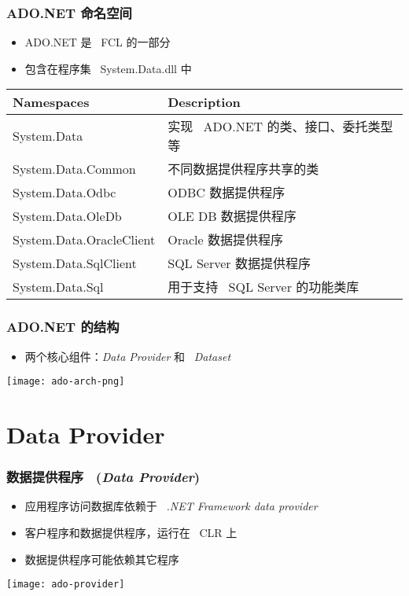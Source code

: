 \begin{frame}
\frametitle{ADO.NET 命名空间}

\begin{itemize}
\item ADO.NET 是 ~FCL 的一部分
\item 包含在程序集 ~System.Data.dll 中
\end{itemize}

\begin{tabular}{l|l}
\hline
\textbf{Namespaces} & \textbf{Description} \\
\hline
\small System.Data & 实现 ~ADO.NET 的类、接口、委托类型等 \\
\small System.Data.Common & 不同数据提供程序共享的类 \\
\small System.Data.Odbc & ODBC 数据提供程序 \\
\small System.Data.OleDb & OLE DB 数据提供程序 \\
\small System.Data.OracleClient & Oracle 数据提供程序 \\
\small System.Data.SqlClient & SQL Server 数据提供程序 \\
\small System.Data.Sql & 用于支持 ~SQL Server 的功能类库 \\
\hline
\end{tabular}
\end{frame}

\begin{frame}
\frametitle{ADO.NET 的结构}

\begin{itemize}
\item 两个核心组件：\textit{Data Provider} 和 ~\textit{Dataset}
\end{itemize}

\begin{center}
  \texttt{[image: ado-arch-png]}
\end{center}

\end{frame}

\section{Data Provider}

\begin{frame}
\frametitle{数据提供程序 ~(\textit{Data Provider})}
\begin{itemize}
\item 应用程序访问数据库依赖于 ~\textit{.NET Framework data provider}
\item 客户程序和数据提供程序，运行在 ~CLR 上
\item 数据提供程序可能依赖其它程序
\end{itemize}
\begin{center}
  \texttt{[image: ado-provider]}
\end{center}
\end{frame}

